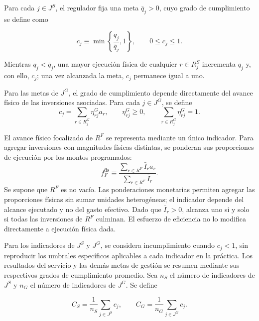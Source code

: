 Para cada \(j\in J^{S}\), el regulador fija una meta \(\bar q_j>0\), cuyo grado de cumplimiento se define como

\begin{equation}
\label{eq:cumplimiento_s}
c_j
\equiv
\min
\left\{
\frac{q_j}{\bar q_j},
1
\right\},
\qquad
0\leq c_j\leq1.
\end{equation}

Mientras \(q_j<\bar q_j\), una mayor ejecución física de cualquier \(r\in R_j^{S}\) incrementa \(q_j\) y, con ello, \(c_j\); una vez alcanzada la meta, \(c_j\) permanece igual a uno.

Para las metas de \(J^{G}\), el grado de cumplimiento depende directamente del avance físico de las inversiones asociadas. Para cada \(j\in J^{G}\), se define
\begin{equation}
\label{eq:cumplimiento_g_f}
c_j=\sum_{r\in R_j^{G}}\eta_{rj}^{G}a_r,
\qquad
\eta_{rj}^{G}\geq0,
\qquad
\sum_{r\in R_j^{G}}\eta_{rj}^{G}=1.
\end{equation}

El avance físico focalizado de \(R^{F}\) se representa mediante un único indicador. Para agregar inversiones con magnitudes físicas distintas, se ponderan sus proporciones de ejecución por los montos programados:
\begin{equation}
\label{eq:avance_fisico_focalizado}
f_F^{\mathrm{fis}}
\equiv
\frac{\sum_{r\in R^{F}}\bar I_r a_r}
{\sum_{r\in R^{F}}\bar I_r}.
\end{equation}
Se supone que \(R^{F}\) es no vacío. Las ponderaciones monetarias permiten agregar las proporciones físicas sin sumar unidades heterogéneas; el indicador depende del alcance ejecutado y no del gasto efectivo. Dado que \(\bar I_r>0\), alcanza uno si y solo si todas las inversiones de \(R^{F}\) culminan. El esfuerzo de eficiencia no lo modifica directamente a ejecución física dada.

Para los indicadores de \(J^{S}\) y \(J^{G}\), se considera incumplimiento cuando \(c_j<1\), sin reproducir los umbrales específicos aplicables a cada indicador en la práctica. Los resultados del servicio y las demás metas de gestión se resumen mediante sus respectivos grados de cumplimiento promedio. Sea \(n_S\) el número de indicadores de \(J^{S}\) y \(n_G\) el número de indicadores de \(J^{G}\). Se define

\begin{equation}
\label{eq:agregados_cumplimiento}
C_S=\frac{1}{n_S}\sum_{j\in J^{S}}c_j,
\qquad
C_G=\frac{1}{n_G}\sum_{j\in J^{G}}c_j.
\end{equation}

